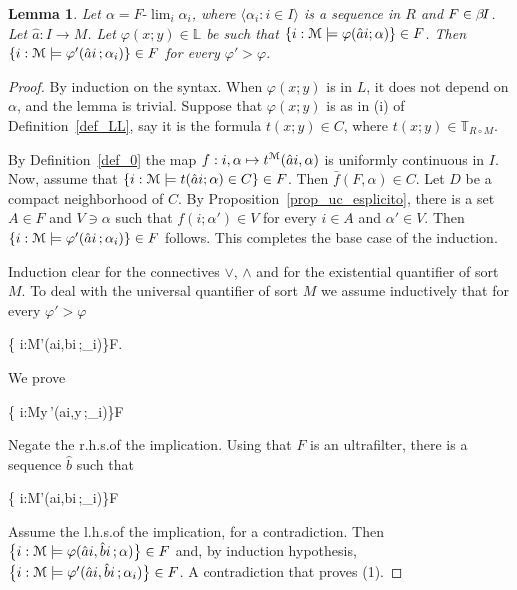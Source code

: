 \documentclass[12pt,letterpaper,oneside,reqno]{amsart}
\newcommand*{\TakeFourierOrnament}[1]{{%
\fontencoding{U}\fontfamily{futs}\selectfont\char#1}}
\renewcommand*{\danger}{\TakeFourierOrnament{66}}
\theoremstyle{plain}
\newtheorem{lemma}[theorem]{Lemma}
\theoremstyle{remark}
\begin{document}
\begin{lemma}\label{lem_HIapprox}
  Let $\alpha=F\mbox{-}\lim_i\alpha_i$, where $\langle \alpha_i:i\in I\rangle$ is a sequence in $R$ and $F\in\beta\kern-1.5pt I$.
  Let $\hat a:I\to M$.
  Let $\varphi(x;y)\in\mathds{L}$ be such that $\{i:{\EuScript M}\models\varphi(\hat ai;\alpha)\}\in F$. Then $\{i:{\EuScript M}\models\varphi'(\hat ai\,;\alpha_i)\}\in F$ for every $\varphi'>\varphi$.
\end{lemma}
\begin{proof}
  \noindent\llap{\textcolor{blue}{\Large\danger}\kern7ex}\ignorespaces
  By induction on the syntax.
  When $\varphi(x;y)$ is in $L$, it does not depend on $\alpha$, and the lemma is trivial.
  Suppose that $\varphi(x;y)$ is as in (i) of Definition~\ref{def_LL}, say it is the formula $t(x;y)\in C$, where $t(x;y)\in \mathds{T}_{R\circ M}$.
  
  By Definition~\ref{def_0} the map $f:i,\alpha \mapsto t^{\EuScript M}(\hat ai,\alpha)$ is uniformly continuous in $I$.
  Now, assume that $\{i:{\EuScript M}\models t(\hat ai;\alpha)\in C\}\in F$.
  Then $\bar f(F,\alpha)\in C$.
  Let $D$ be a compact neighborhood of $C$.
  By Proposition~\ref{prop_uc_esplicito}, there is a set $A\in F$ and $V\ni\alpha$ such that $f(i;\alpha')\in V$ for every $i\in A$ and $\alpha'\in V$.
  Then $\{i:{\EuScript M}\models\varphi'(\hat ai\,;\alpha_i)\}\in F$ follows.
  This completes the base case of the induction.

  Induction clear for the connectives $\vee$, $\wedge$ and for the existential quantifier of sort $M$.
  To deal with the universal quantifier of sort $M$ we assume inductively that for every $\varphi'>\varphi$

  {\Rightarrow}
  {\big\{ i:{\EuScript M}\models\varphi'(\hat ai,\hat bi\,;\alpha_i)\big\}\in F}.
  
  We prove

  {\Rightarrow}
  {\big\{ i:{\EuScript M}\models\forall y\,\varphi'(\hat ai,y\,;\alpha_i)\big\}\in F}
  
  Negate the r.h.s.\@ of the implication.
  Using that $F$ is an ultrafilter, there is a sequence $\hat b$ such that 

  \ceq{}
  { }
  {\big\{ i:{\EuScript M}\not\models\varphi'(\hat ai,\hat bi\,;\alpha_i)\big\}\in F}
  
  Assume the l.h.s.\@ of the implication,  for a contradiction.
  Then $\big\{i:{\EuScript M}\models\varphi(\hat ai,\hat bi\,; \alpha)\big\}\in F$ and, by induction hypothesis, $\big\{ i:{\EuScript M}\models\varphi'(\hat ai,\hat bi\,;\alpha_i)\big\}\in F$. A contradiction that proves (1).
  

\end{proof}
\end{document}
